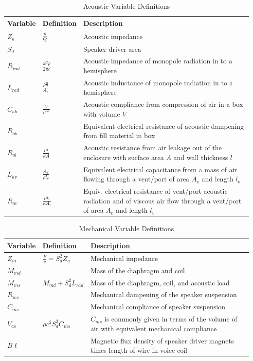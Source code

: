 \documentclass[10pt,letterpaper]{book}
\begin{document}
\begin{table}
\centering
\renewcommand{\arraystretch}{1.5}
\begin{tabularx}{\textwidth}{@{} ll X @{}}
\toprule
Variable & Definition & Description \\
\midrule
$Z_a$ & $\frac{p}{Q}$ & Acoustic impedance\\
$S_d$ & & Speaker driver area\\
$R_{rad}$ & $\frac{\omega^2 \rho}{2\pi c}$ & Acoustic impedance of monopole radiation in to a hemisphere\\
$L_{rad}$ & $\frac{\rho \frac{a}{2}}{A_v}$ & Acoustic inductance of monopole radiation in to a hemisphere\\
$C_{ab}$ & $\frac{V}{\rho c^2}$ & Acoustic compliance from compression of air in a box with volume $V$\\
$R_{ab}$ & & Equivalent electrical resistance of acoustic dampening from fill material in box\\
$R_{al}$ & $\frac{\mu l}{\kappa A}$ & Acoustic resistance from air leakage out of the enclosure with surface area $A$ and wall thickness $l$\\
$L_{av}$ & $\frac{A_v}{\rho l_v}$ & Equivalent electrical capacitance from a mass of air flowing through a vent/port of area $A_v$ and length $l_v$\\
$R_{av}$ & $\frac{\mu l_v}{\kappa A_v}$ & Equiv. electrical resistance of vent/port acoustic radiation and of viscous air flow through a vent/port of area $A_v$ and length $l_v$\\
\bottomrule
\end{tabularx}
\caption{Acoustic Variable Definitions}\label{table:acoustic-variables}
\end{table}

\begin{table}
\centering
\renewcommand{\arraystretch}{1.5}
\begin{tabularx}{\textwidth}{@{} ll X @{}}
\toprule
Variable & Definition & Description \\
\midrule
$Z_m$ & $\frac{F}{v}=S_d^2 Z_a$ & Mechanical impedance\\
$M_{md}$ & & Mass of the diaphragm and coil\\
$M_{ms}$ &$M_{md}+S_d^2L_{rad}$ & Mass of the diaphragm, coil, and acoustic load\\
$R_{ms}$ & & Mechanical dampening of the speaker suspension\\
$C_{ms}$ &  & Mechanical compliance of speaker suspension\\
$V_{as}$ & $\rho c^2 S_d^2 C_{ms}$  & $C_{ms}$ is commonly given in terms of the volume of air with equivalent mechanical compliance\\
$B\ell$ & & Magnetic flux density of speaker driver magnets times length of wire in voice coil\\
\bottomrule
\end{tabularx}
\caption{Mechanical Variable Definitions}\label{table:mech-variables}
\end{table}
\end{document}
